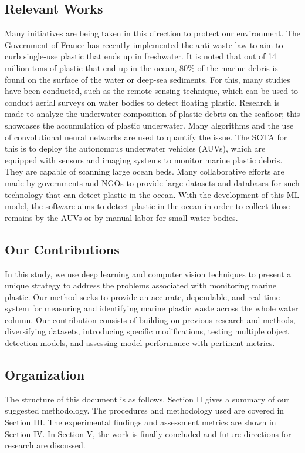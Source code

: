 \documentclass[lettersize,journal]{IEEEtran}
\begin{document}
\subsection{Relevant Works}
Many initiatives are being taken in this direction to protect our environment. The Government of France has recently implemented the anti-waste law to aim to curb single-use plastic that ends up in freshwater. \cite{France} It is noted that out of 14 million tons of plastic that end up in the ocean, 80\% of the marine debris is found on the surface of the water or deep-sea sediments. \cite{IUCN} For this, many studies have been conducted, such as the remote sensing technique, which can be used to conduct aerial surveys on water bodies to detect floating plastic. \cite{Invest} Research is made to analyze the underwater composition of plastic debris on the seafloor; this showcases the accumulation of plastic underwater. Many algorithms and the use of convolutional neural networks are used to quantify the issue. The SOTA for this is to deploy the autonomous underwater vehicles (AUVs), which are equipped with sensors and imaging systems to monitor marine plastic debris. They are capable of scanning large ocean beds. Many collaborative efforts are made by governments and NGOs to provide large datasets and databases for such technology that can detect plastic in the ocean. With the development of this ML model, the software aims to detect plastic in the ocean in order to collect those remains by the AUVs or by manual labor for small water bodies.


\subsection{Our Contributions}
In this study, we use deep learning and computer vision techniques to present a unique strategy to address the problems associated with monitoring marine plastic. Our method seeks to provide an accurate, dependable, and real-time system for measuring and identifying marine plastic waste across the whole water column. Our contribution consists of building on previous research and methods, diversifying datasets, introducing specific modifications, testing multiple object detection models, and assessing model performance with pertinent metrics.


\subsection{Organization}
The structure of this document is as follows. Section II gives a summary of our suggested methodology. The procedures and methodology used are covered in Section III. The experimental findings and assessment metrics are shown in Section IV. In Section V, the work is finally concluded and future directions for research are discussed.
\end{document}
